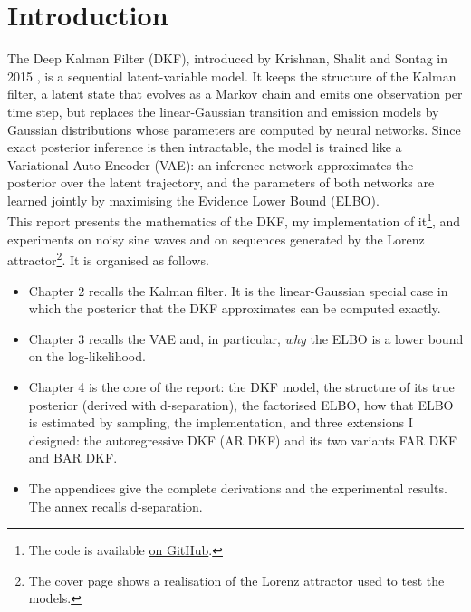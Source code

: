 \chapter{Introduction}

The Deep Kalman Filter (DKF), introduced by Krishnan, Shalit and Sontag
in 2015 \cite{krishnan2015deep}, is a sequential latent-variable model.
It keeps the structure of the Kalman filter, a latent state that evolves
as a Markov chain and emits one observation per time step, but replaces
the linear-Gaussian transition and emission models by Gaussian
distributions whose parameters are computed by neural networks. Since
exact posterior inference is then intractable, the model is trained like
a Variational Auto-Encoder (VAE): an inference network approximates the
posterior over the latent trajectory, and the parameters of both networks
are learned jointly by maximising the Evidence Lower Bound (ELBO).\\

This report presents the mathematics of the DKF, my implementation of
it\footnote{The code is available
\href{https://github.com/CL-BZH/Deep-Kalman-Filters/tree/main}{on
GitHub}.}, and experiments on noisy sine waves and on sequences generated
by the Lorenz attractor\footnote{The cover page shows a realisation of
the Lorenz attractor used to test the models.}. It is organised as
follows.
\begin{itemize}
    \item Chapter 2 recalls the Kalman filter. It is the linear-Gaussian
    special case in which the posterior that the DKF approximates can be
    computed exactly.
    \item Chapter 3 recalls the VAE and, in particular, \emph{why} the
    ELBO is a lower bound on the log-likelihood.
    \item Chapter 4 is the core of the report: the DKF model, the
    structure of its true posterior (derived with d-separation), the
    factorised ELBO, how that ELBO is estimated by sampling, the
    implementation, and three extensions I designed: the autoregressive
    DKF (AR DKF) and its two variants FAR DKF and BAR DKF.
    \item The appendices give the complete derivations and the
    experimental results. The annex recalls d-separation.
\end{itemize}
